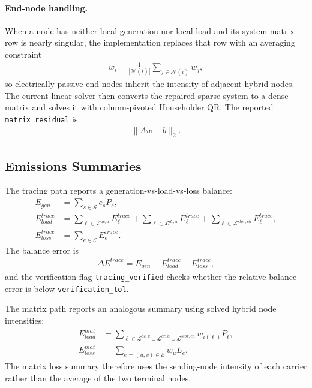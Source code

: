 \paragraph{End-node handling.}
When a node has neither local generation nor local load and its system-matrix
row is nearly singular, the implementation replaces that row with an averaging
constraint
\begin{align}
w_i = \frac{1}{|\mathcal{N}(i)|} \sum_{j \in \mathcal{N}(i)} w_j,
\end{align}
so electrically passive end-nodes inherit the intensity of adjacent hybrid
nodes.  The current linear solver then converts the repaired sparse system to a
dense matrix and solves it with column-pivoted Householder QR.  The reported
\texttt{matrix\_residual} is
\begin{align}
\|Aw-b\|_2.
\end{align}

\subsection{Emissions Summaries}

The tracing path reports a generation-vs-load-vs-loss balance:
\begin{align}
E_{gen} &= \sum_{s \in \mathcal{S}} e_s P_s, \\
E_{load}^{trace} &=
\sum_{\ell \in \mathcal{L}^{ac,u}} E_{\ell}^{trace}
+ \sum_{\ell \in \mathcal{L}^{dc,u}} E_{\ell}^{trace}
+ \sum_{\ell \in \mathcal{L}^{stor,ch}} E_{\ell}^{trace}, \\
E_{loss}^{trace} &= \sum_{e \in \mathcal{E}} E_e^{trace}.
\end{align}
The balance error is
\begin{align}
\Delta E^{trace} = E_{gen} - E_{load}^{trace} - E_{loss}^{trace},
\end{align}
and the verification flag \texttt{tracing\_verified} checks whether the relative
balance error is below \texttt{verification\_tol}.

The matrix path reports an analogous summary using solved hybrid node
intensities:
\begin{align}
E_{load}^{mat} &= \sum_{\ell \in \mathcal{L}^{ac,u} \cup \mathcal{L}^{dc,u} \cup \mathcal{L}^{stor,ch}}
                 w_{i(\ell)} P_{\ell}, \\
E_{loss}^{mat} &= \sum_{e=(u,v) \in \mathcal{E}} w_u L_e.
\end{align}
The matrix loss summary therefore uses the sending-node intensity of each
carrier rather than the average of the two terminal nodes.


